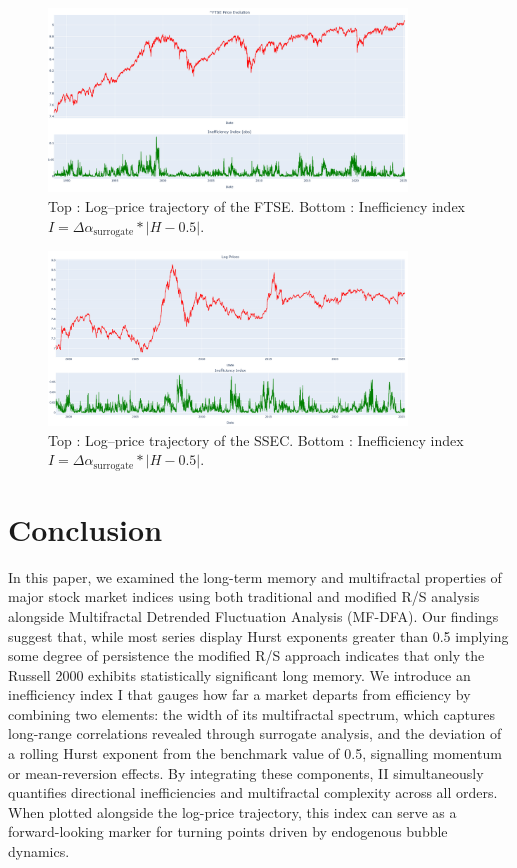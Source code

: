 \documentclass[11pt]{extarticle}
\begin{document}
\begin{figure}[ht]
    \centering
    \includegraphics[width=0.85\textwidth]{img/price_and_ineffiency_ftse_mrs}
    \caption{Top : Log–price trajectory of the FTSE. Bottom : Inefficiency index \(I=\Delta\alpha_{\text{surrogate}} * |H-0.5|\).}
    \label{fig:russell-inefficiency}
\end{figure}
\FloatBarrier


\begin{figure}[ht]
    \centering
    \includegraphics[width=0.85\textwidth]{img/price_and_inefficiency_ssec_mrs}
    \caption{Top : Log–price trajectory of the SSEC. Bottom : Inefficiency index \(I=\Delta\alpha_{\text{surrogate}} * |H-0.5|\).}
    \label{fig:sp500-inefficiency}
\end{figure}
\FloatBarrier



\section{Conclusion}

In this paper, we examined the long-term memory and multifractal properties of major stock market indices using both
traditional and modified R/S analysis alongside Multifractal Detrended Fluctuation Analysis (MF-DFA). Our findings
suggest that, while most series display Hurst exponents greater than 0.5 implying some degree of persistence the
modified R/S approach indicates that only the Russell 2000 exhibits statistically significant long memory.
We introduce an inefficiency index I that gauges how far a market departs from efficiency by combining two elements:
the width of its multifractal spectrum, which captures long-range correlations revealed through surrogate analysis, and
the deviation of a rolling Hurst exponent from the benchmark value of 0.5, signalling momentum or mean-reversion effects.
By integrating these components, II simultaneously quantifies directional inefficiencies and multifractal complexity across
all orders. When plotted alongside the log-price trajectory, this index can serve as a forward-looking marker for turning
points driven by endogenous bubble dynamics.
\end{document}
